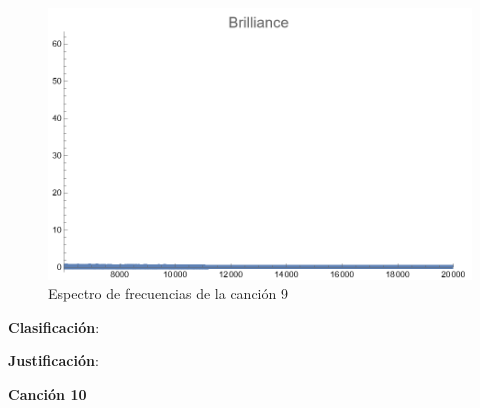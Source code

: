 \documentclass[12pt, letterpaper]{article}
\begin{document}
\begin{figure}[H]
\begin{minipage}{.3\textwidth}
  \end{minipage}
  \begin{minipage}{0.03\textwidth}\end{minipage}
  \begin{minipage}{.3\textwidth}
    \centering
    \includegraphics[width=.9\linewidth]{imgs/Cancion9/brilliance.png}
  \end{minipage}
  \caption{Espectro de frecuencias de la canción 9}
  \label{fig:esp09}
\end{figure}

\textbf{Clasificación}: 

\textbf{Justificación}: 

\newpage

\textbf{\large{Canción 10}}
\end{document}
